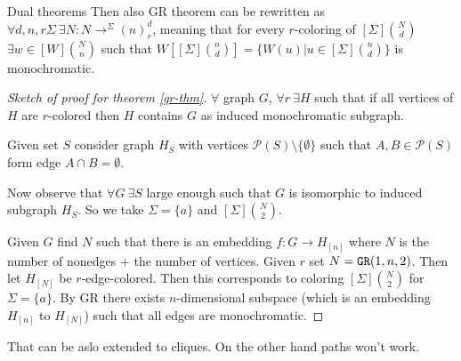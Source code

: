 \begin{topic}{Dual theorems}
	Then also GR theorem can be rewritten as $\forall d, n,r \Sigma \ \exists N : N \to^{\Sigma} (n)_r^d$, meaning that for every $r$-coloring of $[\Sigma]\binom{N}{d}$ $\exists w \in [W]\binom{N}{n}$ such that $W[[\Sigma]\binom{n}{d}] = \{W(u) | u \in [\Sigma]\binom{n}{d}\}$ is monochromatic.
		
	\begin{proof}[Sketch of proof for theorem \ref{gr-thm}]
		$\forall$ graph $G$, $\forall r \ \exists H$ such that if all vertices of $H$ are $r$-colored then $H$ contains $G$ as induced monochromatic subgraph.
		
		Given set $S$ consider graph $H_S$ with vertices $\mathcal{P}(S) \setminus \{\emptyset\}$ such that $A, B \in \mathcal{P}(S)$ form edge \ifft $A \cap B = \emptyset$.
		
		Now observe that $\forall G \ \exists S$ large enough such that $G$ is isomorphic to induced subgraph $H_S$. So we take $\Sigma = \{a\}$ and $[\Sigma]\binom{N}{2}$.
		
		Given $G$ find $N$ such that there is an embedding $f : G \to H_{[n]}$ where $N$ is the number of nonedges + the number of vertices. Given $r$ set $N = \mathtt{GR}(1,n,2)$. Then let $H_{[N]}$ be $r$-edge-colored. Then this corresponds to coloring $[\Sigma]\binom{N}{2}$ for $\Sigma = \{a\}$. By GR there exists $n$-dimensional subspace (which is an embedding $H_{[n]}$ to $H_{[N]}$) such that all edges are monochromatic.
	\end{proof}

	That can be aslo extended to cliques. On the other hand paths won't work.
\end{topic}